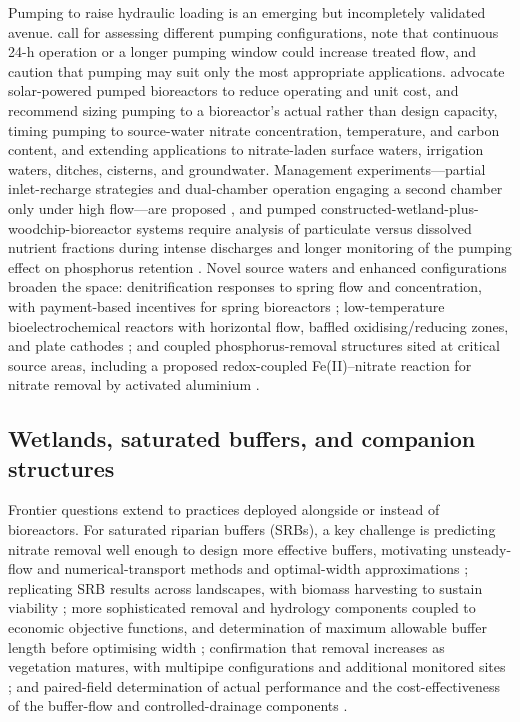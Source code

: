 \documentclass[11pt]{article}
\begin{document}
Pumping to raise hydraulic loading is an emerging but incompletely validated
avenue. \textcite{DíazGarcía2025} call for assessing different pumping
configurations, note that continuous 24-h operation or a longer pumping window
could increase treated flow, and caution that pumping may suit only the most
appropriate applications. \textcite{Hartfiel2024} advocate solar-powered pumped
bioreactors to reduce operating and unit cost, and \textcite{Hartfiel2023}
recommend sizing pumping to a bioreactor's actual rather than design capacity,
timing pumping to source-water nitrate concentration, temperature, and carbon
content, and extending applications to nitrate-laden surface waters, irrigation
waters, ditches, cisterns, and groundwater. Management experiments---partial
inlet-recharge strategies and dual-chamber operation engaging a second chamber
only under high flow---are proposed \parencite{Hartfiel2023b}, and pumped
constructed-wetland-plus-woodchip-bioreactor systems require analysis of
particulate versus dissolved nutrient fractions during intense discharges and
longer monitoring of the pumping effect on phosphorus retention
\parencite{Pugliese2020}. Novel source waters and enhanced configurations broaden
the space: denitrification responses to spring flow and concentration, with
payment-based incentives for spring bioreactors \parencite{Easton2019};
low-temperature bioelectrochemical reactors with horizontal flow, baffled
oxidising/reducing zones, and plate cathodes \parencite{Law2018}; and coupled
phosphorus-removal structures sited at critical source areas, including a proposed
redox-coupled Fe(II)--nitrate reaction for nitrate removal by activated aluminium
\parencite{Penn2024}.

\subsection{Wetlands, saturated buffers, and companion structures}

Frontier questions extend to practices deployed alongside or instead of
bioreactors. For saturated riparian buffers (SRBs), a key challenge is predicting
nitrate removal well enough to design more effective buffers, motivating
unsteady-flow and numerical-transport methods and optimal-width approximations
\parencite{McEachran2020}; replicating SRB results across landscapes, with
biomass harvesting to sustain viability \parencite{Jaynes2014}; more
sophisticated removal and hydrology components coupled to economic objective
functions, and determination of maximum allowable buffer length before optimising
width \parencite{Abdalaal2023}; confirmation that removal increases as vegetation
matures, with multipipe configurations and additional monitored sites
\parencite{Jaynes2019,Jaynes2019b,Singh2024b}; and paired-field determination of
actual performance and the cost-effectiveness of the buffer-flow and
controlled-drainage components \parencite{Ghane2025}.
\end{document}
